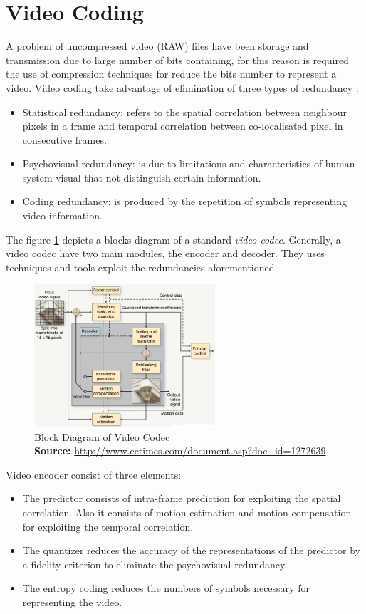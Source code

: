 \section{Video Coding}
A problem of uncompressed video (RAW) files have been storage and transmission due to large number of bits containing, for this reason is required the use of compression techniques for reduce the bits number to represent a video. Video coding take advantage of elimination of three types of redundancy \cite{motion}:
\begin{itemize}
	\item Statistical redundancy: refers to the spatial correlation between neighbour pixels in a frame and temporal correlation between co-localisated pixel in consecutive frames.
	\item Psychovisual redundancy: is due to limitations and characteristics of human system visual that not distinguish certain information.
	\item Coding redundancy: is produced by the repetition of symbols representing video information.
\end{itemize}
	
The figure \ref{codec} depicts a blocks diagram of a standard \emph{video codec}. Generally, a video codec have  two main modules, the encoder and decoder. They uses techniques and tools exploit the redundancies aforementioned. 

\begin{figure}[!h]
\centering
\includegraphics[width=0.6\textwidth]{images/codec}
\caption[Block Diagram of Video Codec]{Block Diagram of Video Codec \\
\scriptsize{\textbf{Source:} \url{http://www.eetimes.com/document.asp?doc_id=1272639}}}
\label{codec}
\end{figure}

Video encoder consist of three elements:
\begin{itemize}
	\item The predictor consists of intra-frame prediction for exploiting the spatial correlation. Also it consists of motion estimation and motion compensation for exploiting the temporal correlation. 
	\item The quantizer reduces the accuracy of the representations of the predictor by a fidelity criterion to eliminate the psychovisual redundancy.
	\item The entropy coding reduces the numbers of symbols necessary for representing the video.
\end{itemize}

